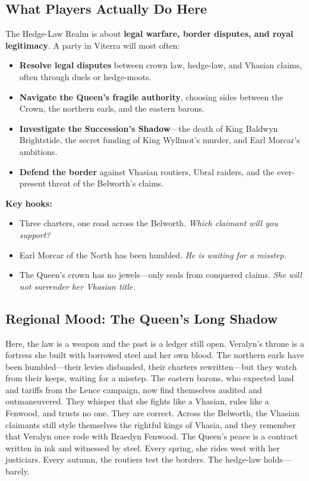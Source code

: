 \subsection*{What Players Actually Do Here}
\label{sec:viterra-player-hooks}

The Hedge-Law Realm is about \textbf{legal warfare, border disputes, and royal legitimacy}. A party in Viterra will most often:

\begin{itemize}
  \item \textbf{Resolve legal disputes} between crown law, hedge-law, and Vhasian claims, often through duels or hedge-moots.
  \item \textbf{Navigate the Queen's fragile authority}, choosing sides between the Crown, the northern earls, and the eastern barons.
  \item \textbf{Investigate the Succession's Shadow}---the death of King Baldwyn Brightstide, the secret funding of King Wyllmot's murder, and Earl Morcar's ambitions.
  \item \textbf{Defend the border} against Vhasian routiers, Ubral raiders, and the ever-present threat of the Belworth's claims.
\end{itemize}

\textbf{Key hooks:}
\begin{itemize}
  \item Three charters, one road across the Belworth. \textit{Which claimant will you support?}
  \item Earl Morcar of the North has been humbled. \textit{He is waiting for a misstep.}
  \item The Queen's crown has no jewels---only seals from conquered claims. \textit{She will not surrender her Vhasian title.}
\end{itemize}

\subsection*{Regional Mood: The Queen's Long Shadow}

Here, the law is a weapon and the past is a ledger still open. Veralyn's throne is a fortress she built with borrowed steel and her own blood. The northern earls have been humbled---their levies disbanded, their charters rewritten---but they watch from their keeps, waiting for a misstep. The eastern barons, who expected land and tariffs from the Lence campaign, now find themselves audited and outmaneuvered. They whisper that she fights like a Vhasian, rules like a Fenwood, and trusts no one. They are correct. Across the Belworth, the Vhasian claimants still style themselves the rightful kings of Vhasia, and they remember that Veralyn once rode with Braedyn Fenwood. The Queen's peace is a contract written in ink and witnessed by steel. Every spring, she rides west with her justiciars. Every autumn, the routiers test the borders. The hedge-law holds---barely.

